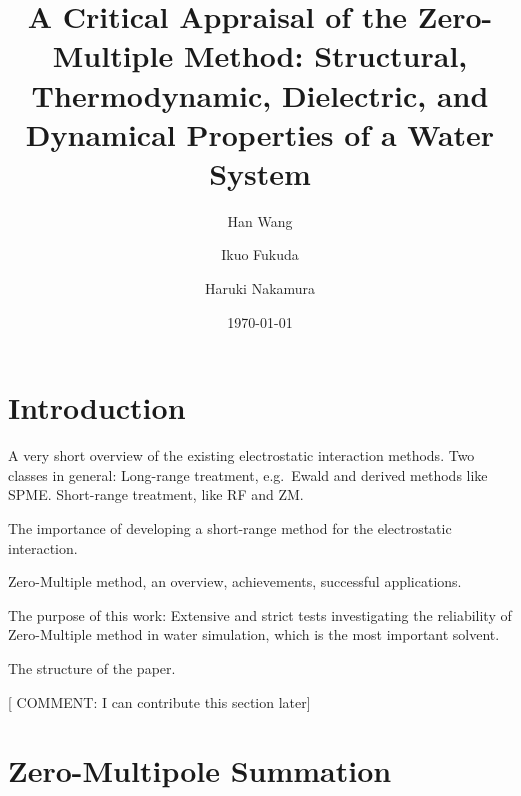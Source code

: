 \documentclass[a4paper,preprint,unsortedaddress,onecolumn,fleqn]{revtex4}
\begin{document}
\title{A Critical Appraisal of the Zero-Multiple Method: Structural,
Thermodynamic, Dielectric, and Dynamical Properties of a Water System}
\author{Han Wang}
\author{Ikuo Fukuda}
\author{Haruki Nakamura}
\date{\today}

\begin{abstract}
\end{abstract}

\maketitle


\section{Introduction}

A very short overview of the existing electrostatic interaction methods. Two
classes in general: Long-range treatment, e.g.~Ewald and derived methods
like SPME. Short-range treatment, like RF and ZM.

The importance of developing a short-range method for the electrostatic
interaction.

Zero-Multiple method, an overview, achievements, successful applications.

The purpose of this work: Extensive and strict tests investigating the
reliability of Zero-Multiple method in water simulation, which is the most
important solvent.

The structure of the paper.

[{\color{blue} COMMENT: I can contribute this section later}]

\section{Zero-Multipole Summation}
\end{document}
